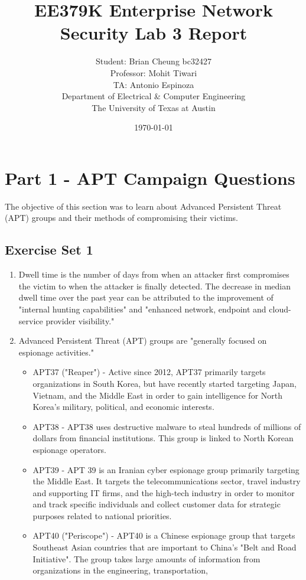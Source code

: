 \documentclass[11pt]{article}
\author{Student: Brian Cheung bc32427 \\ Professor: Mohit Tiwari \\ TA: Antonio Espinoza \\ Department of Electrical \& Computer Engineering \\ The University of Texas at Austin}
\date{\today}
\title{EE379K Enterprise Network Security Lab 3 Report}
\begin{document}
\maketitle
\newpage
\section*{Part 1 - APT Campaign Questions}
\label{sec:part-1}
The objective of this section was to learn about Advanced Persistent Threat (APT) groups
and their methods of compromising their victims.

\subsection*{Exercise Set 1}
\begin{enumerate}
  \item Dwell time is the number of days from when an attacker first compromises
  the victim to when the attacker is finally detected. The decrease in median dwell
  time over the past year can be attributed to the improvement of "internal hunting
  capabilities" and "enhanced network, endpoint and cloud-service provider visibility."~\cite{m-trend}
  \item Advanced Persistent Threat (APT) groups are "generally focused on espionage activities."
  \begin{itemize}
    \item APT37 ("Reaper") - Active since 2012, APT37 primarily targets organizations
    in South Korea, but have recently started targeting Japan, Vietnam, and the
    Middle East in order to gain intelligence for North Korea's military, political,
    and economic interests.
    \item APT38 - APT38 uses destructive malware to steal hundreds of millions of dollars
    from financial institutions. This group is linked to North Korean espionage operators.
    \item APT39 - APT 39 is an Iranian cyber espionage group primarily targeting the Middle East.
    It targets the telecommunications sector, travel industry and supporting IT firms,
    and the high-tech industry in order to monitor and track specific individuals and collect
    customer data for strategic purposes related to national priorities.
    \item APT40 ("Periscope") - APT40 is a Chinese espionage group that targets Southeast
    Asian countries that are important to China's "Belt and Road Initiative". The group takes
    large amounts of information from organizations in the engineering, transportation,

\end{itemize}
\end{enumerate}
\end{document}
